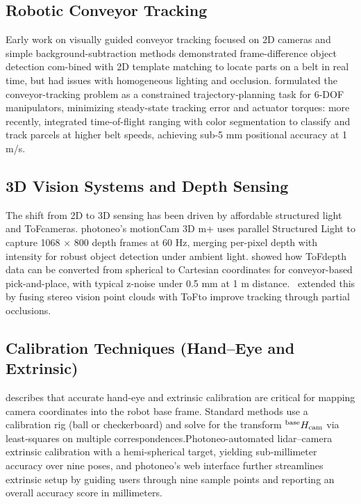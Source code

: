 \documentclass[12pt]{article}
\begin{document}
\subsection{Robotic Conveyor Tracking}
Early work on visually guided conveyor tracking focused on 2D cameras and simple background-subtraction methods\cite{ref12} demonstrated frame-difference object detection com-bined with 2D template matching to locate parts on a belt in real time, but had issues with homogeneous lighting and occlusion.\cite{ref14} formulated the conveyor-tracking problem as a constrained trajectory‐planning task for 6-DOF manipulators, minimizing steady-state tracking error and actuator torques: more recently,\cite{ref9} integrated time-of-flight ranging with color segmentation to classify and track parcels at higher belt speeds, achieving sub-5 mm positional accuracy at 1 m/s.\\

\subsection{3D Vision Systems and Depth Sensing}
The shift from 2D to 3D sensing has been driven by affordable structured light and ToFcameras\cite{ref2}. photoneo’s motionCam 3D m+ uses parallel Structured Light to capture 1068 × 800 depth frames at 60 Hz, merging per-pixel depth with intensity for robust object detection under ambient light. \cite{ref17} showed how ToFdepth data can be converted from spherical to Cartesian coordinates for conveyor-based pick-and-place, with typical z-noise under 0.5 mm at 1 m distance.\ \cite{ref3} extended this by fusing stereo vision point clouds with ToFto improve tracking through partial occlusions.\\


\subsection{Calibration Techniques (Hand–Eye and Extrinsic)}
\cite{ref3} describes that accurate hand-eye and extrinsic calibration are critical for mapping camera coordinates into the robot base frame. Standard methods use a calibration rig (ball or checkerboard) and solve for the transform ${}^{\rm base}H_{\rm cam}$ via least‐squares on multiple correspondences\cite{ref2}.Photoneo-automated lidar–camera extrinsic calibration with a hemi-spherical target, yielding sub‐millimeter accuracy over nine poses, and photoneo’s web interface further streamlines extrinsic setup by guiding users through nine sample points and reporting an overall accuracy score in millimeters.
\end{document}
